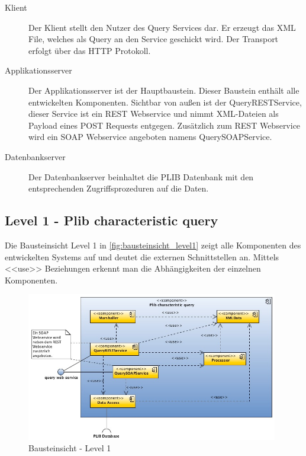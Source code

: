 \begin{description}
\item[Klient] Der Klient stellt den Nutzer des Query Services dar. Er erzeugt das XML File, welches als Query an den Service geschickt wird. Der Transport erfolgt über das HTTP Protokoll. 
\item[Applikationsserver] Der Applikationsserver ist der Hauptbaustein. Dieser Baustein enthält alle entwickelten Komponenten. Sichtbar von außen ist der QueryRESTService, dieser Service ist ein \gls{REST} \gls{Webservice} und nimmt XML-Dateien als Payload eines POST Requests entgegen. Zusätzlich zum \gls{REST}  \gls{Webservice} wird ein \gls{SOAP} \gls{Webservice} angeboten namens QuerySOAPService. 
\item[Datenbankserver] Der Datenbankserver beinhaltet die PLIB Datenbank mit den entsprechenden Zugriffsprozeduren auf die Daten. 
\end{description}

\subsection{Level 1 - Plib characteristic query} 

Die Bausteinsicht Level 1 in \autoref{fig:bausteinsicht_level1} zeigt alle Komponenten des entwickelten Systems auf und deutet die externen Schnittstellen an. Mittels <<use>> Beziehungen erkennt man die Abhängigkeiten der einzelnen Komponenten. 

\begin{figure}[htbp]
	\centering
		\includegraphics[width=0.98\textwidth]{images/bausteinsicht_plib_level1.jpg}
	\caption{Bausteinsicht - Level 1}
	\label{fig:bausteinsicht_level1}
\end{figure}

